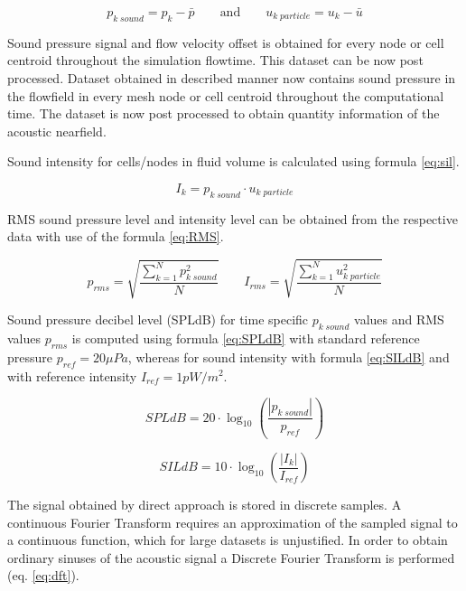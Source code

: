 \begin{equation} \label{eq:off}
p_{k \; sound} = p_k - \bar{p} \qquad \text{and} \qquad u_{k \; particle} = u_k - \bar{u}
\end{equation}

Sound pressure signal and flow velocity offset is obtained for every node or cell centroid throughout the simulation flowtime. This dataset can be now post processed. Dataset obtained in described manner now contains sound pressure in the flowfield in every mesh node or cell centroid throughout the computational time. The dataset is now post processed to obtain quantity information of the acoustic nearfield. 

Sound intensity for cells/nodes in fluid volume is calculated using formula \ref{eq:sil}. 

\begin{equation} \label{eq:sil}
I_{k} = p_{k \; sound} \cdot u_{k \; particle}
\end{equation}

RMS sound pressure level and intensity level can be obtained from the respective data with use of the formula \ref{eq:RMS}.

\begin{equation} \label{eq:RMS}
p_{rms} = \sqrt{\frac{\sum_{k=1}^{N} p_{k \; sound}^{2}}{N}} \qquad I_{rms} = \sqrt{\frac{\sum_{k=1}^{N} u_{k \; particle}^{2}}{N}}
\end{equation}

Sound pressure decibel level (SPLdB) for time specific $p_{k \; sound}$ values and RMS values $p_{rms}$ is computed using formula \ref{eq:SPLdB} with standard reference pressure $p_{ref} = 20 \mu Pa$, whereas for sound intensity with formula \ref{eq:SILdB} and with reference intensity $I_{ref} = 1 pW/m^{2}$.

\begin{equation} \label{eq:SPLdB}
SPLdB = 20 \cdot \log_{10}\left(\frac{|p_{k \; sound}|}{p_{ref}}\right)
\end{equation}

\begin{equation} \label{eq:SILdB}
SILdB = 10 \cdot \log_{10}\left(\frac{|I_{k}|}{I_{ref}}\right)
\end{equation}

The signal obtained by direct approach is stored in discrete samples. A continuous Fourier Transform requires an approximation of the sampled signal to a continuous function, which for large datasets is unjustified. In order to obtain ordinary sinuses of the acoustic signal a Discrete Fourier Transform is performed (eq. \ref{eq:dft}).

